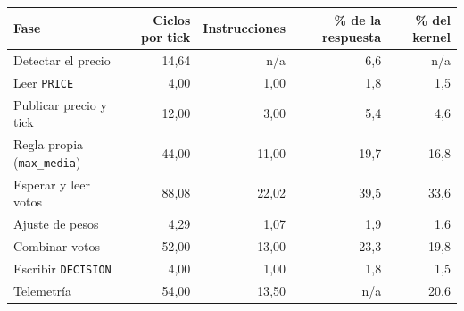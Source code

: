 \begin{tabular}{lrrrr}
\toprule
Fase & Ciclos por tick & Instrucciones & \% de la respuesta & \% del kernel \\
\midrule
Detectar el precio & 14{,}64 & n/a & 6{,}6 & n/a \\
Leer \texttt{PRICE} & 4{,}00 & 1{,}00 & 1{,}8 & 1{,}5 \\
Publicar precio y tick & 12{,}00 & 3{,}00 & 5{,}4 & 4{,}6 \\
Regla propia (\texttt{max\_media}) & 44{,}00 & 11{,}00 & 19{,}7 & 16{,}8 \\
Esperar y leer votos & 88{,}08 & 22{,}02 & 39{,}5 & 33{,}6 \\
Ajuste de pesos & 4{,}29 & 1{,}07 & 1{,}9 & 1{,}6 \\
Combinar votos & 52{,}00 & 13{,}00 & 23{,}3 & 19{,}8 \\
Escribir \texttt{DECISION} & 4{,}00 & 1{,}00 & 1{,}8 & 1{,}5 \\
Telemetría & 54{,}00 & 13{,}50 & n/a & 20{,}6 \\
\bottomrule
\end{tabular}
\par{}
